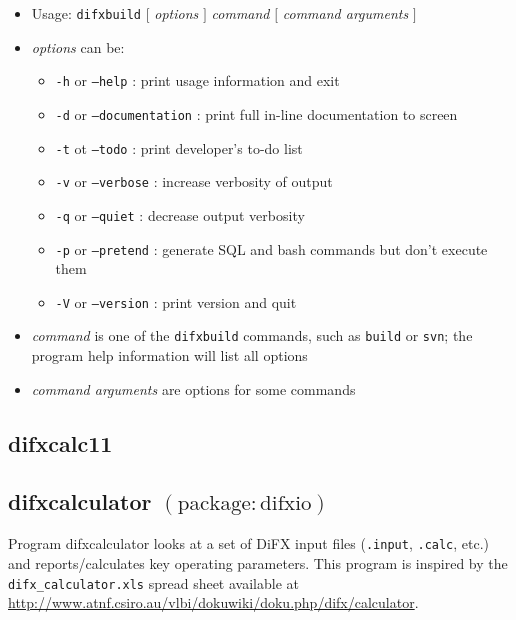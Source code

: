 \begin{itemize}
\item[] Usage: {\tt difxbuild} $[$ {\em options} $]$ {\em command} $[$ {\em command arguments} $]$ 
\item[] {\em options} can be:
\begin{itemize}
\item[] {\tt -h} or {\tt --help} : print usage information and exit
\item[] {\tt -d} or {\tt --documentation} : print full in-line documentation to screen
\item[] {\tt -t} ot {\tt --todo} : print developer's to-do list
\item[] {\tt -v} or {\tt --verbose} : increase verbosity of output
\item[] {\tt -q} or {\tt --quiet} : decrease output verbosity
\item[] {\tt -p} or {\tt --pretend} : generate SQL and bash commands but don't execute them
\item[] {\tt -V} or {\tt --version} : print version and quit
\end{itemize}
\item[] {\em command} is one of the {\tt difxbuild} commands, such as {\tt build} or {\tt svn}; the program help information will list all options
\item[] {\em command arguments} are options for some commands
\end{itemize}






\subsection{difxcalc11}





\subsection{difxcalculator {\small $\mathrm{(package: difxio)}$}} \label{sec:difxcalculator}

Program difxcalculator looks at a set of DiFX input files ({\tt .input}, {\tt .calc}, etc.) and reports/calculates key operating parameters.
This program is inspired by the {\tt difx\_calculator.xls} spread sheet available at \url{http://www.atnf.csiro.au/vlbi/dokuwiki/doku.php/difx/calculator}.

